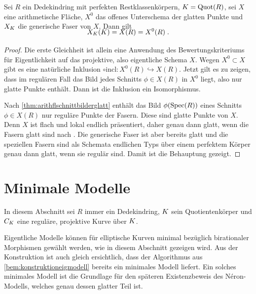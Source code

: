 \begin{Satz}\label{thm:ratpkteregulaeremodelle}
  Sei $R$ ein Dedekindring
  mit perfekten Restklassenkörpern,
  $K=\operatorname{Quot}(R)$,
  sei $X$ eine arithmetische Fläche,
  $X^0$ das offenes Unterschema der glatten Punkte und
  $X_{K}$ die generische Faser von $X$.
  Dann gilt
  \begin{gather*}
    \SwapAboveDisplaySkip
    X_\K(\K)=X(R)=X^0(R)\;.
  \end{gather*}
  \begin{proof}
    Die erste Gleichheit ist allein eine Anwendung des
    Bewertungskriteriums für Eigentlichkeit auf das projektive, also
    eigentliche Schema $X$.
    Wegen $X^0\subset X$ gibt es eine natürliche Inklusion
    $\circ \text{incl}\colon X^0(R)\hookrightarrow X(R)$.
    Jetzt gilt es zu zeigen, dass im regulären Fall das Bild jedes
    Schnitts $\phi\in X(R)$ in $X^0$ liegt, also nur glatte Punkte
    enthält. Dann ist die Inklusion ein Isomorphismus.
    
    Nach \ref{thm:arithflschnittbilderglatt} enthält das Bild
    $\phi(\operatorname{Spec}(R))$ eines Schnitts $\phi\in X(R)$ nur reguläre
    Punkte der Fasern. Diese sind glatte Punkte von $X$. Denn
    $X$ ist flach und lokal endlich präsentiert, daher genau dann
    glatt, wenn die Fasern glatt sind nach
    \cite[Proposition~8.5/17]{bosch}.
    Die generische Faser ist aber bereits glatt und die speziellen
    Fasern sind als Schemata endlichen Typs über einem perfektem
    Körper genau dann glatt, wenn sie regulär sind.
    Damit ist die Behauptung gezeigt.
  \end{proof}
\end{Satz}


\section{Minimale Modelle}\label{chap:minmodelle}
In diesem Abschnitt sei $R$ immer ein Dedekindring,
$K$ sein Quotientenkörper und $C_{K}$ eine
reguläre, projektive Kurve über $K$.

Eigentliche Modelle können für elliptische Kurven minimal
bezüglich birationaler Morphismen gewählt werden, wie in diesem
Abschnitt gezeigen wird. Aus der Konstruktion ist auch gleich ersichtlich,
dass der Algorithmus aus \ref{bem:konstruktioneigmodell} bereits ein
minimales Modell liefert.
Ein solches minimales Modell ist die Grundlage für den späteren
Existenzbeweis des Néron-Modells, welches genau dessen glatter Teil
ist.

